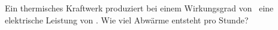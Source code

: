 Ein thermisches Kraftwerk produziert bei einem Wirkungsgrad von \etKO\ eine elektrische Leistung von \PelO. Wie viel Abwärme entsteht pro Stunde?
